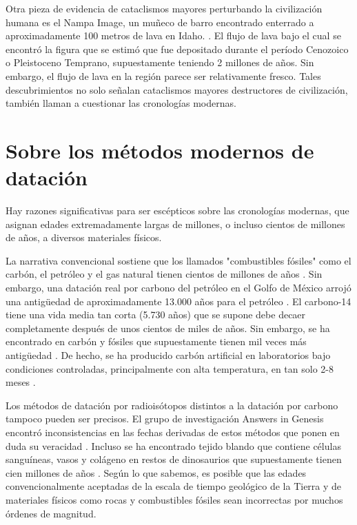\documentclass[10pt,twocolumn,letterpaper]{article}
\begin{document}
Otra pieza de evidencia de cataclismos mayores perturbando la civilización humana es el Nampa Image, un muñeco de barro encontrado enterrado a aproximadamente 100 metros de lava en Idaho. \cite{102,103}. El flujo de lava bajo el cual se encontró la figura que se estimó que fue depositado durante el período Cenozoico o Pleistoceno Temprano, supuestamente teniendo 2 millones de años. Sin embargo, el flujo de lava en la región parece ser relativamente fresco. Tales descubrimientos no solo señalan cataclismos mayores destructores de civilización, también llaman a cuestionar las cronologías modernas.

\section{Sobre los métodos modernos de datación}

Hay razones significativas para ser escépticos sobre las cronologías modernas, que asignan edades extremadamente largas de millones, o incluso cientos de millones de años, a diversos materiales físicos.

La narrativa convencional sostiene que los llamados "combustibles fósiles" como el carbón, el petróleo y el gas natural tienen cientos de millones de años \cite{104}. Sin embargo, una datación real por carbono del petróleo en el Golfo de México arrojó una antigüedad de aproximadamente 13.000 años para el petróleo \cite{105}. El carbono-14 tiene una vida media tan corta (5.730 años) que se supone debe decaer completamente después de unos cientos de miles de años. Sin embargo, se ha encontrado en carbón y fósiles que supuestamente tienen mil veces más antigüedad \cite{106}. De hecho, se ha producido carbón artificial en laboratorios bajo condiciones controladas, principalmente con alta temperatura, en tan solo 2-8 meses \cite{107}.

Los métodos de datación por radioisótopos distintos a la datación por carbono tampoco pueden ser precisos. El grupo de investigación Answers in Genesis encontró inconsistencias en las fechas derivadas de estos métodos que ponen en duda su veracidad \cite{108}. Incluso se ha encontrado tejido blando que contiene células sanguíneas, vasos y colágeno en restos de dinosaurios que supuestamente tienen cien millones de años \cite{109,110}. Según lo que sabemos, es posible que las edades convencionalmente aceptadas de la escala de tiempo geológico de la Tierra y de materiales físicos como rocas y combustibles fósiles sean incorrectas por muchos órdenes de magnitud.
\end{document}
